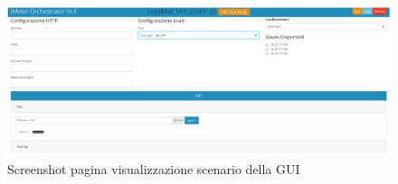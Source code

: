  \begin{figure}[H]
 	\centering
 	\includegraphics[width=\textwidth]{immagini/guishow}
 	\caption{Screenshot pagina visualizzazione scenario della GUI}
 	\label{img-guishow}
 \end{figure}
\newpage